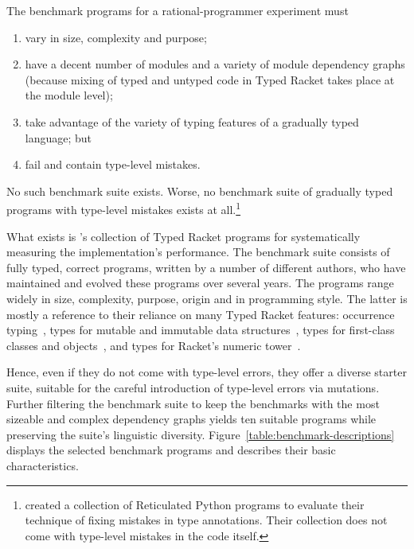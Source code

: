 
The benchmark programs for a rational-programmer experiment must 
\begin{enumerate}
   
\item vary in size, complexity and purpose; 
    
\item have a decent number of modules and a variety of module dependency graphs
 (because mixing of typed and untyped code in Typed Racket takes place at the
 module level);

\item take advantage of the variety of typing features of a gradually typed
 language; but

\item fail and contain type-level mistakes. 
\end{enumerate}
No such benchmark suite exists.  Worse, no benchmark suite of
gradually typed programs with type-level mistakes exists at
all.\footnote{\citet{cc-oopsla-20} created a collection of Reticulated
Python programs to evaluate their technique of fixing mistakes in type
annotations. Their collection does not come with type-level mistakes
in the code itself.} 

What exists is \citet{gtnffvf-jfp-2019}'s collection of Typed Racket programs
for systematically measuring the implementation's performance. The benchmark
suite consists of fully typed, correct programs, written by a number of
different authors, who have maintained and evolved these programs over several
years. The programs range widely in size, complexity, purpose, origin and in
programming style. The latter is mostly a reference to their reliance on many
Typed Racket features: occurrence typing~\cite{tf-icfp-2010}, types for mutable
and immutable data structures~\cite{hpst-sfp-2010}, types for first-class
classes and objects~\cite{tsdtf-oopsla-2012}, and types for Racket's numeric
tower~\cite{stathff-padl-12}.

Hence, even if they do not come with type-level errors, they offer a diverse
starter suite, suitable for the careful introduction of type-level errors via
mutations. Further filtering the benchmark suite to keep the benchmarks with the
most sizeable and complex dependency graphs yields ten suitable programs while
preserving the suite's linguistic diversity. Figure~\ref{table:benchmark-descriptions} displays the selected
benchmark programs and describes their basic characteristics.
